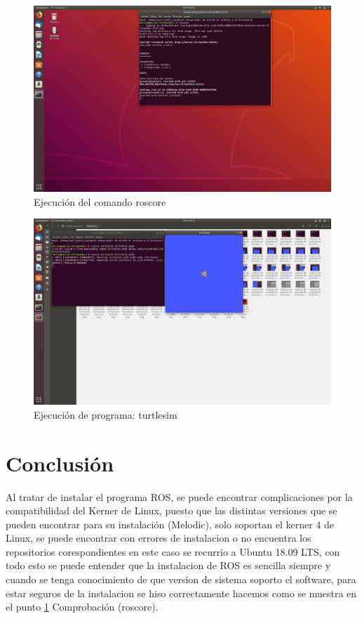 \documentclass[11pt,a4paper,oldfontcommands,oneside]{memoir}
\begin{document}
\begin{figure}[h]
	\includegraphics[scale=.25]{link21.png}
	\caption{Ejecución del comando roscore}
	\label{roscore1}
\end{figure}
\begin{figure}[h]
\includegraphics[scale=.25]{link23.png}
\caption{Ejecución de programa: turtlesim}
	\label{roscore2}
\end{figure}
\section{Conclusión}
Al tratar de instalar el programa ROS, se puede encontrar complicaciones por la compatibilidad del Kerner de Linux, puesto que las distintas versiones que se pueden encontrar para su instalación (Melodic), solo soportan el kerner 4 de Linux, se puede encontrar con errores de instalacion o no encuentra los repositorios corespondientes en este caso se recurrio a Ubuntu 18.09 LTS, con todo esto se puede entender que la instalacion de ROS es sencilla siempre y cuando se tenga conocimiento de que version de sistema soporto el software, para estar seguros de la instalacion se hiso correctamente hacemos como se muestra en el punto \ref{roscore1} Comprobación (roscore). 
\vspace{2cm}
\hfill


\end{document}
